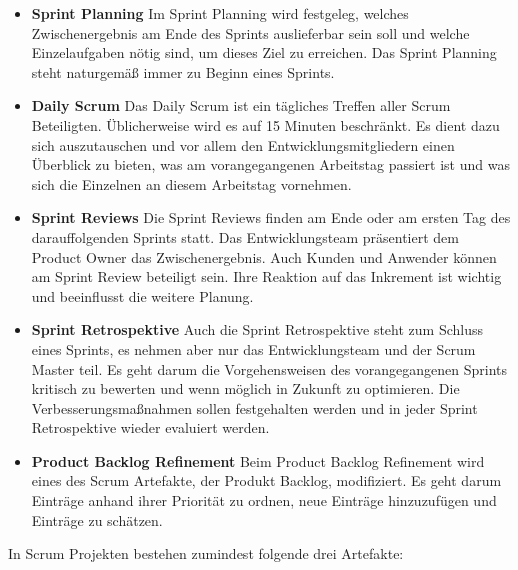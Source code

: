 \begin{itemize}
\item \textbf{Sprint Planning} Im Sprint Planning wird festgeleg, welches Zwischenergebnis am Ende des Sprints auslieferbar sein soll und welche Einzelaufgaben nötig sind, um dieses Ziel zu erreichen. Das Sprint Planning steht naturgemäß immer zu Beginn eines Sprints.
\item \textbf{Daily Scrum} Das Daily Scrum ist ein tägliches Treffen aller Scrum Beteiligten. Üblicherweise wird es auf 15 Minuten beschränkt. Es dient dazu sich auszutauschen und vor allem den Entwicklungsmitgliedern einen Überblick zu bieten, was am vorangegangenen Arbeitstag passiert ist und was sich die Einzelnen an diesem Arbeitstag vornehmen.
\item \textbf{Sprint Reviews} Die Sprint Reviews finden am Ende oder am ersten Tag des darauffolgenden Sprints statt. Das Entwicklungsteam präsentiert dem Product Owner das Zwischenergebnis. Auch Kunden und Anwender können am Sprint Review beteiligt sein. Ihre Reaktion auf das Inkrement ist wichtig und beeinflusst die weitere Planung.
\item \textbf{Sprint Retrospektive} Auch die Sprint Retrospektive steht zum Schluss eines Sprints, es nehmen aber nur das Entwicklungsteam und der Scrum Master teil. Es geht darum die Vorgehensweisen des vorangegangenen Sprints kritisch zu bewerten und wenn möglich in Zukunft zu optimieren. Die Verbesserungsmaßnahmen sollen festgehalten werden und in jeder Sprint Retrospektive wieder evaluiert werden.
\item \textbf{Product Backlog Refinement} Beim Product Backlog Refinement wird eines des Scrum Artefakte, der Produkt Backlog, modifiziert. Es geht darum Einträge anhand ihrer Priorität zu ordnen, neue Einträge hinzuzufügen und Einträge zu schätzen.
\end{itemize}

In Scrum Projekten bestehen zumindest folgende drei Artefakte:

